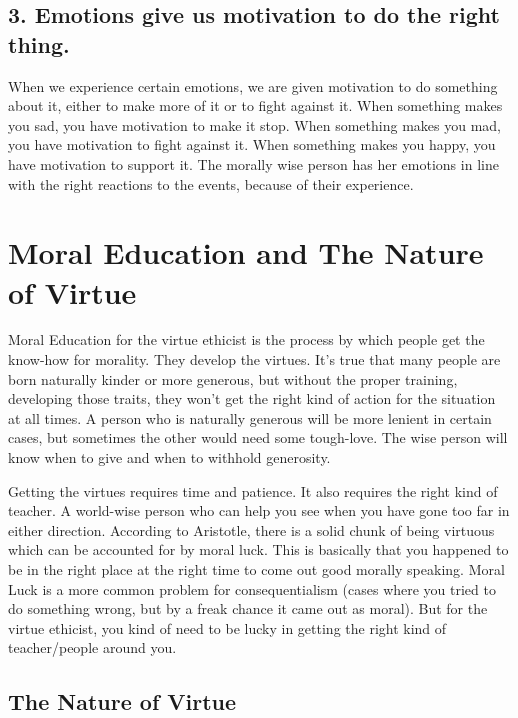 \subsection{3. Emotions give us motivation to do the right thing.}

When we experience certain emotions, we are given motivation to do something about it, either to make more of it or to fight against it. When something makes you sad, you have motivation to make it stop. When something makes you mad, you have motivation to fight against it. When something makes you happy, you have motivation to support it. The morally wise person has her emotions in line with the right reactions to the events, because of their experience.

\section{Moral Education and The Nature of Virtue}

Moral Education for the virtue ethicist is the process by which people get the know-how for morality. They develop the virtues. It’s true that many people are born naturally kinder or more generous, but without the proper training, developing those traits, they won’t get the right kind of action for the situation at all times. A person who is naturally generous will be more lenient in certain cases, but sometimes the other would need some tough-love. The wise person will know when to give and when to withhold generosity.

Getting the virtues requires time and patience. It also requires the right kind of teacher. A world-wise person who can help you see when you have gone too far in either direction. According to Aristotle, there is a solid chunk of being virtuous which can be accounted for by moral luck. This is basically that you happened to be in the right place at the right time to come out good morally speaking. Moral Luck is a more common problem for consequentialism (cases where you tried to do something wrong, but by a freak chance it came out as moral). But for the virtue ethicist, you kind of need to be lucky in getting the right kind of teacher/people around you.

\subsection{The Nature of Virtue}

